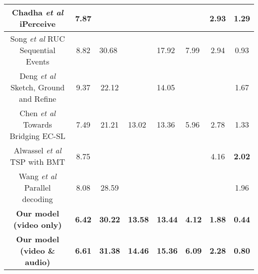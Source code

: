 \begin{table}[]
\begin{tabular}{|c|cclllcc|}
		Chadha \textit{et al} \cite{chadha2020iperceive} iPerceive                 & \multicolumn{1}{c|}{7.87}          & \multicolumn{1}{l|}{}               & \multicolumn{1}{l|}{}                & \multicolumn{1}{l|}{}                & \multicolumn{1}{l|}{}              & \multicolumn{1}{c|}{2.93}          & 1.29                               \\ \hline
		Song \textit{et al} \cite{songruc} RUC Sequential Events                 & \multicolumn{1}{c|}{8.82}          & \multicolumn{1}{l|}{30.68}               & \multicolumn{1}{l|}{}                & \multicolumn{1}{l|}{17.92}                & \multicolumn{1}{l|}{7.99}              & \multicolumn{1}{c|}{2.94}          & 0.93                               \\ \hline
		Deng \textit{et al} \cite{deng2021sketch} Sketch, Ground and Refine   & \multicolumn{1}{c|}{9.37}          & \multicolumn{1}{c|}{22.12}          & \multicolumn{1}{l|}{}                & \multicolumn{1}{l|}{14.05}           & \multicolumn{1}{l|}{}              & \multicolumn{1}{c|}{}              & 1.67                               \\ \hline
		Chen \textit{et al} \cite{chen2021towards} Towards Bridging EC-SL      & \multicolumn{1}{c|}{7.49}          & \multicolumn{1}{c|}{21.21}          & \multicolumn{1}{l|}{13.02}           & \multicolumn{1}{l|}{13.36}           & \multicolumn{1}{l|}{5.96}          & \multicolumn{1}{c|}{2.78}          & 1.33                               \\ \hline
		{Alwassel \textit{et al} \cite{alwassel2021tsp} TSP with BMT}            & \multicolumn{1}{c|}{8.75}          & \multicolumn{1}{l|}{}               & \multicolumn{1}{l|}{}                & \multicolumn{1}{l|}{}                & \multicolumn{1}{l|}{}              & \multicolumn{1}{c|}{4.16}          & \textbf{2.02}                               \\ \hline
		Wang \textit{et al} \cite{wang2021endtoend} Parallel decoding           & \multicolumn{1}{c|}{8.08}          & \multicolumn{1}{c|}{28.59}          & \multicolumn{1}{l|}{}                & \multicolumn{1}{l|}{}                & \multicolumn{1}{l|}{}              & \multicolumn{1}{c|}{}              & 1.96                               \\ \hline
		\textbf{Our model (video only)}                     & \multicolumn{1}{c|}{\textbf{6.42}} & \multicolumn{1}{l|}{\textbf{30.22}} & \multicolumn{1}{l|}{\textbf{13.58}} & \multicolumn{1}{l|}{\textbf{13.44}} & \multicolumn{1}{l|}{\textbf{4.12}} & \multicolumn{1}{l|}{\textbf{1.88}} & \multicolumn{1}{l|}{\textbf{0.44}} \\ \hline
		\textbf{Our model (video \& audio)}                     & \multicolumn{1}{c|}{\textbf{6.61}} & \multicolumn{1}{l|}{\textbf{31.38}} & \multicolumn{1}{l|}{\textbf{14.46}} & \multicolumn{1}{l|}{\textbf{15.36}} & \multicolumn{1}{l|}{\textbf{6.09}} & \multicolumn{1}{l|}{\textbf{2.28}} & \multicolumn{1}{l|}{\textbf{0.80}} \\ \hline
	\end{tabular}
	

\end{table}
